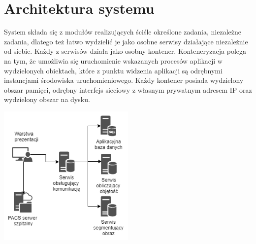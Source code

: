 \documentclass[a4paper,11pt,twoside]{report}
\theoremstyle{definition}
\begin{document}
\section{Architektura systemu}

System składa się z modułów realizujących ściśle określone zadania, niezależne zadania, dlatego też łatwo wydzielić je jako osobne serwisy działające niezależnie od siebie. Każdy z serwisów działa jako osobny kontener. Konteneryzacja polega na tym, że umożliwia się uruchomienie wskazanych procesów aplikacji w wydzielonych obiektach, które z punktu widzenia aplikacji są odrębnymi instancjami środowiska uruchomieniowego. Każdy kontener posiada wydzielony obszar pamięci, odrębny interfejs sieciowy z własnym prywatnym adresem IP oraz wydzielony obszar na dysku.

\begin{minipage}[h]{\linewidth}
	\centering
	\includegraphics[width=0.5\textwidth]{Architektura.png}
\end{minipage}
\end{document}
